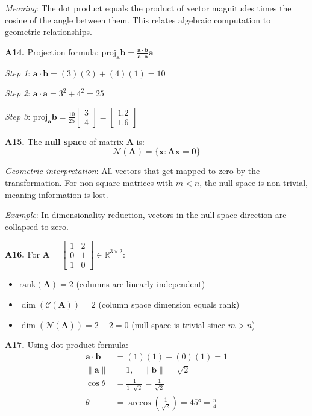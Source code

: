 \documentclass[12pt,a4paper]{article}
\theoremstyle{definition}
\begin{document}
\textit{Meaning}: The dot product equals the product of vector magnitudes times the cosine of the angle between them. This relates algebraic computation to geometric relationships.

\textbf{A14.} Projection formula: $\text{proj}_{\mathbf{a}}\mathbf{b} = \frac{\mathbf{a} \cdot \mathbf{b}}{\mathbf{a} \cdot \mathbf{a}} \mathbf{a}$

\textit{Step 1}: $\mathbf{a} \cdot \mathbf{b} = (3)(2) + (4)(1) = 10$

\textit{Step 2}: $\mathbf{a} \cdot \mathbf{a} = 3^2 + 4^2 = 25$

\textit{Step 3}: $\text{proj}_{\mathbf{a}}\mathbf{b} = \frac{10}{25} \begin{bmatrix} 3 \\ 4 \end{bmatrix} = \begin{bmatrix} 1.2 \\ 1.6 \end{bmatrix}$

\textbf{A15.} The \textbf{null space} of matrix $\mathbf{A}$ is:
\[
\mathcal{N}(\mathbf{A}) = \{\mathbf{x} : \mathbf{A}\mathbf{x} = \mathbf{0}\}
\]

\textit{Geometric interpretation}: All vectors that get mapped to zero by the transformation. For non-square matrices with $m < n$, the null space is non-trivial, meaning information is lost.

\textit{Example}: In dimensionality reduction, vectors in the null space direction are collapsed to zero.

\textbf{A16.} For $\mathbf{A} = \begin{bmatrix} 1 & 2 \\ 0 & 1 \\ 1 & 0 \end{bmatrix} \in \mathbb{R}^{3 \times 2}$:

\begin{itemize}
\item $\text{rank}(\mathbf{A}) = 2$ (columns are linearly independent)
\item $\dim(\mathcal{C}(\mathbf{A})) = 2$ (column space dimension equals rank)
\item $\dim(\mathcal{N}(\mathbf{A})) = 2 - 2 = 0$ (null space is trivial since $m > n$)
\end{itemize}

\textbf{A17.} Using dot product formula:
\begin{align}
\mathbf{a} \cdot \mathbf{b} &= (1)(1) + (0)(1) = 1 \\
\|\mathbf{a}\| &= 1, \quad \|\mathbf{b}\| = \sqrt{2} \\
\cos \theta &= \frac{1}{1 \cdot \sqrt{2}} = \frac{1}{\sqrt{2}} \\
\theta &= \arccos\left(\frac{1}{\sqrt{2}}\right) = 45° = \frac{\pi}{4}
\end{align}
\end{document}
